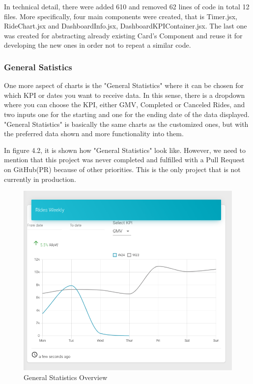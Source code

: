 In technical detail, there were added 610 and removed 62 lines of code in total 12 files. More specifically, four main components were created, that is Timer.jsx, RideChart.jsx and DashboardInfo.jsx, DashboardKPIContainer.jsx. The last one was created for abstracting already existing Card's Component and reuse it for developing the new ones in order not to repeat a similar code. \par

\subsubsection{General Satistics}

One more aspect of charts is the "General Statistics" where it can be chosen for which KPI or dates you want to receive data. In this sense, there is a dropdown where you can choose the KPI, either GMV, Completed or Canceled Rides, and two inputs one for the starting and one for the ending date of the data displayed. "General Statistics" is basically the same charts as the customized ones, but with the preferred data shown and more functionality into them. \par
In figure 4.2, it is shown how "General Statistics" look like. However, we need to mention that this project was never completed and fulfilled with a Pull Request on GitHub(PR) because of other priorities. This is the only project that is not currently in production. \par


\begin{figure}[H]
	\begin{center}
		\includegraphics[scale=0.3]{images/my_projects/Statistics/General_Statistics.png}
	\end{center}
	\caption{General Statistics Overview}
\end{figure}


